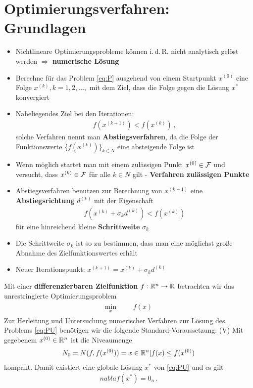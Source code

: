 \chapter{Optimierungsverfahren: Grundlagen}
\begin{itemize}
\item Nichtlineare Optimierungsprobleme können i.\,d.\,R. nicht analytisch gelöst werden $\Rightarrow$ \textbf{numerische Lösung}
\item Berechne für das Problem \eqref{eq:P} ausgehend von einem Startpunkt $x^{(0)}$ eine Folge ${x^{(k)}}, k = 1, 2,\ldots, $ mit dem Ziel, dass die Folge gegen die Lösung $x^*$ konvergiert
\item Naheliegendes Ziel bei den Iterationen:
\begin{align*}
f(x^{(k+1)}) < f (x^{(k)}) \,,
\end{align*}
solche Verfahren nennt man \textbf{Abstiegsverfahren}, da die Folge der Funktionswerte $\lbrace f(x^{(k)})\rbrace_{k \in N}$ eine absteigende Folge ist
\item Wenn möglich startet man mit einem zulässigen Punkt $x^{(0)} \in \mathcal{F}$ und versucht, dass $x^{(k)} \in \mathcal{F}$ für alle $k \in N$ gilt - \textbf{Verfahren zulässigen Punkte}
\item Abstiegsverfahren benutzen zur Berechnung von $x^{(k+1)}$ eine \textbf{Abstiegsrichtung} $d^{(k)}$ mit der Eigenschaft
\begin{align*}
f(x^{(k)} + \sigma_k d^{(k)}) < f(x^{(k)})
\end{align*}
für eine hinreichend kleine \textbf{Schrittweite} $\sigma_k$
\item Die Schrittweite $\sigma_k$ ist so zu bestimmen, dass man eine möglichst große Abnahme des Zielfunktionswertes erhält
\item Neuer Iterationspunkt: $x^{(k+1)} = x^{(k)} + \sigma_k d^{(k)}$
\end{itemize}

Mit einer \textbf{differenzierbaren Zielfunktion} $f: \mathbb R^n \rightarrow \mathbb R$ betrachten wir das unrestringierte Optimierungsproblem
	\begin{gather*} 
	\label{eq:PU}
  		\tag{PU}
  			\begin{aligned}
    			\min_x
    			& & & f(x)
  			\end{aligned}
	\end{gather*}
Zur Herleitung und Untersuchung numerischer Verfahren zur Lösung des Problems \eqref{eq:PU} benötigen wir die folgende Standard-Voraussetzung:
(V) Mit gegebenem $x^{(0)} \in \mathbb R^n$ ist die Niveaumenge
\begin{align*}
N_0 = N (f, f(x^{(0)})) = {x \in \mathbb R^n | f (x)  \leq f(x^{(0)})}
\end{align*}
kompakt.
Damit existiert eine globale Lösung $x^*$ von \eqref{eq:PU} und es gilt 
\begin{align*}
nabla f(x^* ) = 0_n \,.
\end{align*}

